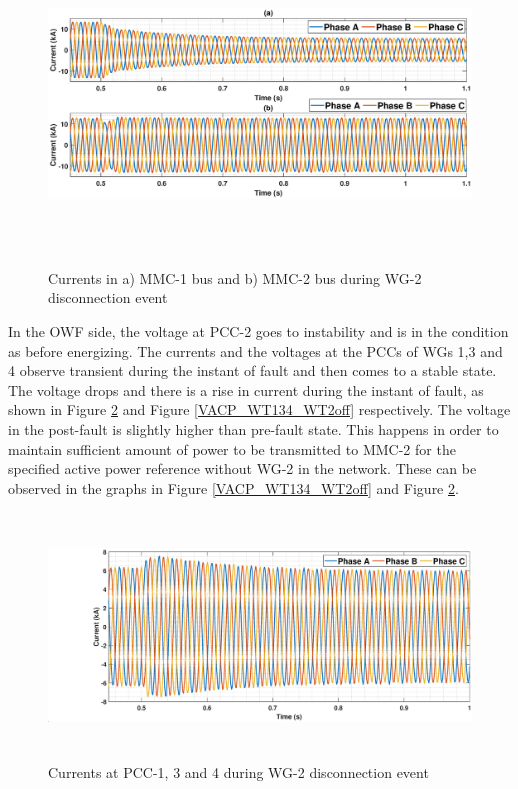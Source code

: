 \begin{figure}[H]
\hspace*{-1.2cm}
    \includegraphics[height =8.5cm,width = 18.5cm]{Diagrams/Chapter_5/IABC_MMC_1_2_WT2off.eps}
    \caption{Currents in a) MMC-1 bus and b) MMC-2 bus during WG-2 disconnection event}
    \label{IABC_MMC_1_2_WT2off}
\end{figure}


In the \gls{OWF} side, the voltage at \gls{PCC}-2 goes to instability and is in the condition as before energizing. The currents and the voltages at the \gls{PCC}s of \gls{WG}s 1,3 and 4 observe transient during the instant of fault and then comes to a stable state. The voltage drops and there is a rise in current during the instant of fault, as shown in Figure \ref{IABC_WT1234_WT2off} and Figure \ref{VACP_WT134_WT2off} respectively. The voltage in the post-fault is slightly higher than pre-fault state. This happens in order to maintain sufficient amount of power to be transmitted to \gls{MMC}-2 for the specified active power reference without \gls{WG}-2 in the network. These can be observed in the graphs in Figure \ref{VACP_WT134_WT2off} and Figure \ref{IABC_WT1234_WT2off}.

\begin{figure}[H]
\centering
    \includegraphics[height = 6.5cm,width = 17.5cm]{Diagrams/Chapter_5/IABC_WT1234_WT2off.eps}
    \caption{Currents at PCC-1, 3 and 4 during WG-2 disconnection event}
    \label{IABC_WT1234_WT2off}
\end{figure}

